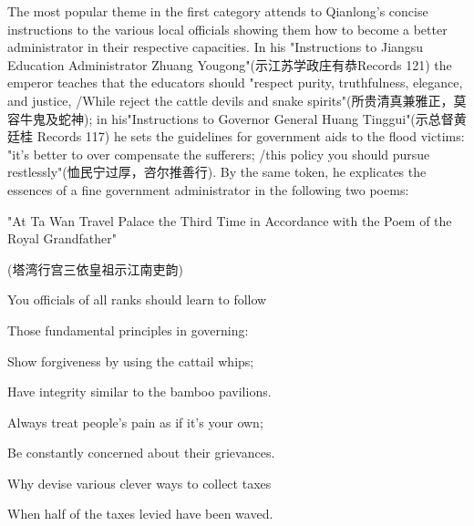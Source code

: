 The most popular theme in the first category attends to Qianlong's concise instructions to the various local officials showing them how to become a better administrator in their respective capacities. In his "Instructions to Jiangsu Education Administrator Zhuang Yougong"(示江苏学政庄有恭Records 121) the emperor teaches that the educators should "respect purity, truthfulness, elegance, and justice, /While reject the cattle devils and snake spirits"(所贵清真兼雅正，莫容牛鬼及蛇神); in his"Instructions to Governor General Huang Tinggui"(示总督黄廷桂 Records 117) he sets the guidelines for government aids to the flood victims: "it's better to over compensate the sufferers; /this policy you should pursue restlessly"(恤民宁过厚，咨尔推善行). By the same token, he explicates the essences of a fine government administrator in the following two poems:

"At Ta Wan Travel Palace the Third Time in Accordance with the Poem of the Royal Grandfather"

(塔湾行宫三依皇祖示江南吏韵)

\begin{BookQuote}
You officials of all ranks should learn to follow
\end{BookQuote}

\begin{BookQuote}
Those fundamental principles in governing:
\end{BookQuote}

\begin{BookQuote}
Show forgiveness by using the cattail whips;
\end{BookQuote}

\begin{BookQuote}
Have integrity similar to the bamboo pavilions.
\end{BookQuote}

\begin{BookQuote}
Always treat people's pain as if it's your own;
\end{BookQuote}

\begin{BookQuote}
Be constantly concerned about their grievances.
\end{BookQuote}

\begin{BookQuote}
Why devise various clever ways to collect taxes
\end{BookQuote}

\begin{BookQuote}
When half of the taxes levied have been waved.
\end{BookQuote}


